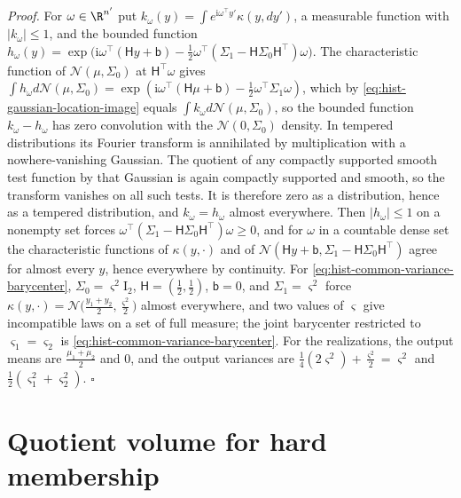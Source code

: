 \noindent\emph{Proof.}
For $\omega\in\R^{n'}$ put $k_\omega(y)=\int e^{\mathrm i\omega^\top y'}\kappa(y,dy')$, a
measurable function with $|k_\omega|\leq1$, and the bounded function
$h_\omega(y)=\exp\bigl(\mathrm i\omega^\top(\mathsf Hy+\mathsf
b)-\tfrac12\omega^\top(\Sigma_1-\mathsf H\Sigma_0\mathsf H^\top)\omega\bigr)$.  The
characteristic function of $\mathcal N(\mu,\Sigma_0)$ at $\mathsf H^\top\omega$ gives
$\int h_\omega d\mathcal N(\mu,\Sigma_0)=\exp(\mathrm i\omega^\top(\mathsf H\mu+\mathsf
b)-\tfrac12\omega^\top\Sigma_1\omega)$, which by \eqref{eq:hist-gaussian-location-image}
equals $\int k_\omega d\mathcal N(\mu,\Sigma_0)$, so the bounded function
$k_\omega-h_\omega$ has zero convolution with the $\mathcal N(0,\Sigma_0)$ density.  In
tempered distributions its Fourier transform is annihilated by multiplication with a
nowhere-vanishing Gaussian. The quotient of any compactly supported smooth test function by that
Gaussian is again compactly supported and smooth, so the transform vanishes on all such tests.
It is therefore zero as a distribution, hence as a tempered distribution, and
$k_\omega=h_\omega$ almost everywhere.  Then $|h_\omega|\leq1$ on a nonempty set forces
$\omega^\top(\Sigma_1-\mathsf H\Sigma_0\mathsf H^\top)\omega\geq0$, and for $\omega$ in a
countable dense set the characteristic functions of $\kappa(y,\cdot)$ and of
$\mathcal N(\mathsf Hy+\mathsf b,\Sigma_1-\mathsf H\Sigma_0\mathsf H^\top)$ agree for
almost every $y$, hence everywhere by continuity.  For
\eqref{eq:hist-common-variance-barycenter}, $\Sigma_0=\varsigma^2\mathrm I_2$,
$\mathsf H=(\tfrac12,\tfrac12)$, $\mathsf b=0$, and $\Sigma_1=\varsigma^2$ force
$\kappa(y,\cdot)=\mathcal N\bigl(\tfrac{y_1+y_2}{2},\tfrac{\varsigma^2}{2}\bigr)$ almost
everywhere, and two values of $\varsigma$ give incompatible laws on a set of full
measure; the joint barycenter restricted to $\varsigma_1=\varsigma_2$ is
\eqref{eq:hist-common-variance-barycenter}.  For the realizations, the output means are
$\tfrac{\mu_1+\mu_2}{2}$ and $0$, and the output variances are
$\tfrac14(2\varsigma^2)+\tfrac{\varsigma^2}2=\varsigma^2$ and
$\tfrac12(\varsigma_1^2+\varsigma_2^2)$.  $\square$

\section{Quotient volume for hard membership}
\label{sec:cg-quotient-volume}

